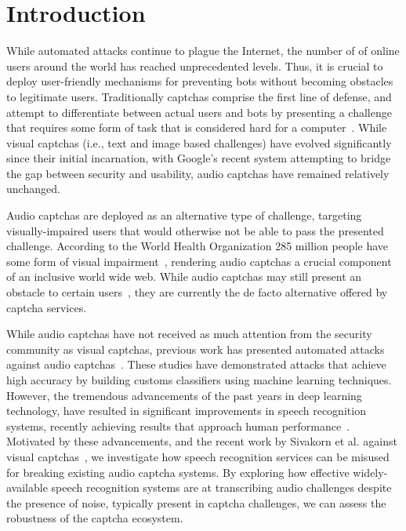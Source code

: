 \section{Introduction}
\label{sec:intro}

While automated attacks continue to plague the Internet,
the number of of online users around the world has reached unprecedented levels.
Thus, it is crucial to deploy user-friendly mechanisms for preventing bots without
becoming obstacles to legitimate users. Traditionally captchas comprise the first 
line of defense, and attempt to differentiate between actual users and bots by 
presenting a challenge that requires some form of task that is considered hard 
for a computer~\cite{captcha}. While visual captchas (i.e., text and image based challenges) 
have evolved significantly since their initial incarnation, with Google's recent \re system 
attempting to bridge the gap between security and usability, audio captchas have remained 
relatively unchanged.

Audio captchas are deployed as an alternative type of challenge, targeting
visually-impaired users that would otherwise not be able to pass the presented
challenge. According to the World Health Organization 285 million people have 
some form of visual impairment~\cite{impaired}, rendering audio captchas a
crucial component of an inclusive world wide web. While audio captchas may still present
an obstacle to certain users~\cite{sauer2008towards,bigham2008inspiring,bigham2009evaluating},
they are currently the de facto alternative offered by captcha services.

While audio captchas have not received as much attention from the security community as visual captchas,
previous work has presented automated attacks against audio captchas~\cite{Sano2013,Bursztein2009,
meutzner2014using,tam2009breaking,bursztein2011failure}. These studies have demonstrated attacks
that achieve high accuracy by building customs classifiers using machine learning techniques.
However, the tremendous advancements of the past years in deep learning technology, have
resulted in significant improvements in speech recognition systems, recently achieving
results that approach human performance~\cite{ibm_blog,saon2017english}. Motivated
by these advancements, and the recent work by Sivakorn et al. against visual
captchas~\cite{sivakorn:eurosp16}, we investigate how speech recognition services
can be misused for breaking existing audio captcha systems. By exploring how effective
widely-available speech recognition systems are at transcribing audio challenges despite 
the presence of noise, typically present in captcha challenges, we can assess the robustness 
of the captcha ecosystem.

